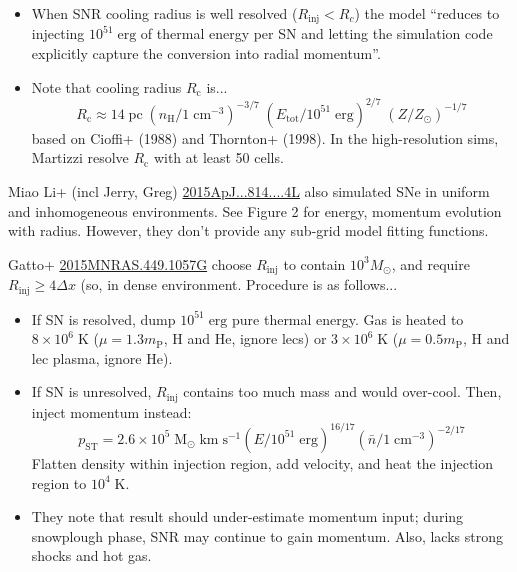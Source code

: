 \documentclass[10pt]{article}
\newcommand*{\mt}{\mathrm}
\newcommand*{\unit}[1]{\;\mt{#1}}  %
\newcommand*{\sun}{\odot}
\begin{document}
\begin{itemize}
    \item When SNR cooling radius is well resolved ($R_\mt{inj} < R_c$)
        the model ``reduces to injecting $10^{51} \unit{erg}$ of thermal energy
        per SN and letting the simulation code explicitly capture the
        conversion into radial momentum''.

    \item Note that cooling radius $R_\mt{c}$ is...
\[
    R_\mt{c} \approx 14 \unit{pc}
        \; \left(n_\mt{H}/1\unit{cm^{-3}}\right)^{-3/7}
        \; \left(E_\mt{tot}/10^{51}\unit{erg}\right)^{2/7}
        \; \left(Z/Z_\sun\right)^{-1/7}
\]
    based on Cioffi+ (1988) and Thornton+ (1998).  In the high-resolution sims,
    Martizzi resolve $R_\mt{c}$ with at least 50 cells.
\end{itemize}


Miao Li+ (incl Jerry, Greg)
\href{https://ui.adsabs.harvard.edu/abs/2015ApJ...814....4L/abstract}{2015ApJ...814....4L}
also simulated SNe in uniform and inhomogeneous environments.
See Figure 2 for energy, momentum evolution with radius.
However, they don't provide any sub-grid model fitting functions.

Gatto+ \href{https://ui.adsabs.harvard.edu/abs/2015MNRAS.449.1057G/abstract}{2015MNRAS.449.1057G}
choose $R_\mt{inj}$ to contain $10^3 M_\sun$, and require
$R_\mt{inj} \geq 4 \Delta x$ (so, in dense environment.  Procedure is as
follows...
\begin{itemize}
    \item If SN is resolved, dump $10^{51} \unit{erg}$ pure thermal energy.
        Gas is heated to $8 \times 10^6 \unit{K}$ ($\mu = 1.3 m_\mt{P}$, H and
        He, ignore lecs) or $3 \times 10^6 \unit{K}$ ($\mu =  0.5 m_\mt{P}$, H
        and lec plasma, ignore He).
    \item If SN is unresolved, $R_\mt{inj}$ contains too much mass and would
        over-cool.  Then, inject momentum instead:
\[
    p_\mt{ST} = 2.6\times10^5 \unit{M_\sun\;km\;s^{-1}}
        \left(E/10^{51}\unit{erg}\right)^{16/17}
        \left(\bar{n}/1\unit{cm^{-3}}\right)^{-2/17}
\]
    Flatten density within injection region, add velocity, and heat the
    injection region to $10^4\unit{K}$.
\item They note that result should under-estimate momentum input;
    during snowplough phase, SNR may continue to gain momentum.
    Also, lacks strong shocks and hot gas.
\end{itemize}
\end{document}
